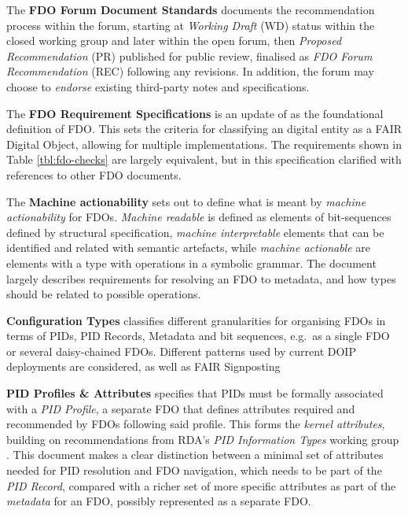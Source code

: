 \documentclass[fleqn,10pt,lineno]{wlpeerjlua}
\begin{document}
The \textbf{FDO Forum Document Standards} \autocite{fdo-DocProcessStd} documents the recommendation process within the forum, starting at \emph{Working Draft} (WD) status within the closed working group and later within the open forum, then \emph{Proposed Recommendation} (PR) published for public review, finalised as \emph{FDO Forum Recommendation} (REC) following any revisions. In addition, the forum may choose to \emph{endorse} existing third-party notes and specifications.

The \textbf{FDO Requirement Specifications} \autocite{fdo-RequirementSpec} is an update of \autocite{boninoFAIRDigitalObject} as the foundational definition of FDO. This sets the criteria for classifying an digital entity as a FAIR Digital Object, allowing for multiple implementations. The requirements shown in Table \ref{tbl:fdo-checks} are largely equivalent, but in this specification clarified with references to other FDO documents.

The \textbf{Machine actionability} \autocite{fdo-MachineActionDef} sets out to define what is meant by \emph{machine actionability} for FDOs. \emph{Machine readable} is defined as elements of bit-sequences defined by structural specification, \emph{machine interpretable} elements that can be identified and related with semantic artefacts, while \emph{machine actionable} are elements with a type with operations in a symbolic grammar. The document largely describes requirements for resolving an FDO to metadata, and how types should be related to possible operations.

\textbf{Configuration Types} \autocite{fdo-ConfigurationTypes} classifies different granularities for organising FDOs in terms of PIDs, PID Records, Metadata and bit sequences, e.g.~as a single FDO or several daisy-chained FDOs. Different patterns used by current DOIP deployments are considered, as well as FAIR Signposting \autocite{vandesompelFAIRSignpostingProfile2022}

\textbf{PID Profiles \& Attributes} \autocite{fdo-PIDProfileAttributes} specifies that PIDs must be formally associated with a \emph{PID Profile}, a separate FDO that defines attributes required and recommended by FDOs following said profile. This forms the \emph{kernel attributes}, building on recommendations from RDA's \emph{PID Information Types} working group \autocite{weigelRDARecommendationPID2018}. This document makes a clear distinction between a minimal set of attributes needed for PID resolution and FDO navigation, which needs to be part of the \emph{PID Record}, compared with a richer set of more specific attributes as part of the \emph{metadata} for an FDO, possibly represented as a separate FDO.
\end{document}
